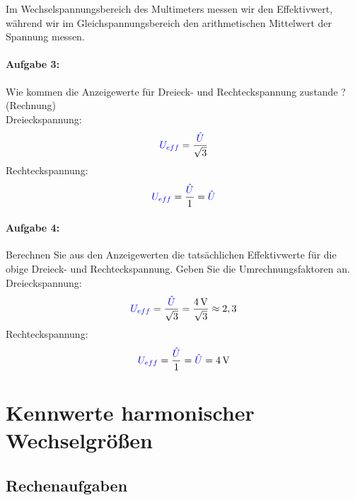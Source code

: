 \documentclass[a4paper,titlepage,parskip]{scrreprt}
\newcommand{\spannung}[1]{\textcolor{blue}{#1}}
\begin{document}
			Im Wechselspannungsbereich des Multimeters messen wir den Effektivwert, während wir im Gleichspannungsbereich den arithmetischen Mittelwert der Spannung messen.
            
            \subsubsection{Aufgabe 3:} Wie kommen die Anzeigewerte für Dreieck- und Rechteckspannung zustande ?   (Rechnung)\\
            
            Dreieckspannung:
            \begin{equation*}
            	\spannung{U_{eff}} = \frac{\spannung{\hat{U}}}{\sqrt{3}}
            \end{equation*}
            Rechteckspannung:
            \begin{equation*}
            	\spannung{U_{eff}} = \frac{\spannung{\hat{U}}}{1} = \spannung{\hat{U}}
            \end{equation*}
            \subsubsection{Aufgabe 4:} Berechnen Sie aus den Anzeigewerten die tatsächlichen Effektivwerte für die   obige Dreieck- und Rechteckspannung. Geben Sie die Umrechnungsfaktoren an.\\
            
            Dreieckspannung:
            \begin{equation*}
            	\spannung{U_{eff}} = \frac{\spannung{\hat{U}}}{\sqrt{3}} = \frac{\SI{4}{\volt}}{\sqrt{3}} \approx 2,3
            \end{equation*}
            Rechteckspannung:
            \begin{equation*}
            	\spannung{U_{eff}} = \frac{\spannung{\hat{U}}}{1} = \spannung{\hat{U}} = \SI{4}{\volt}
            \end{equation*}                      
                
    \chapter{Kennwerte harmonischer Wechselgrößen}
     
        \section{Rechenaufgaben}
\end{document}
